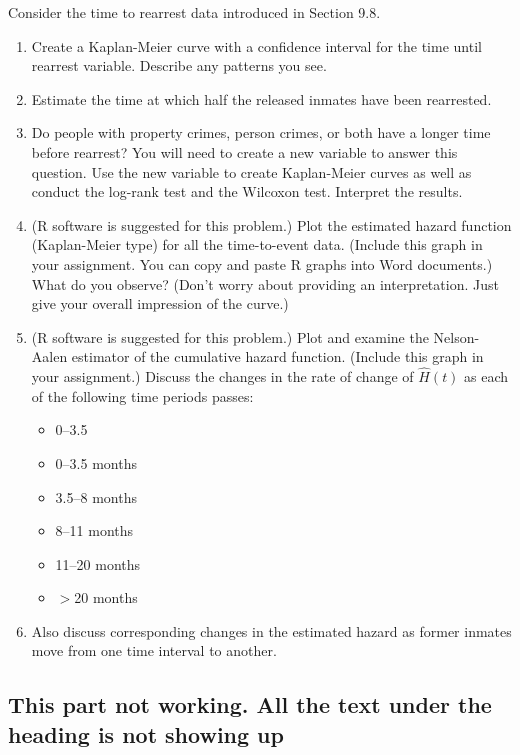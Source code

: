\documentclass[
]{report}
\begin{document}
\begin{list}{E.}{ \setlength{\itemsep}{1.2em}}
Consider the time to rearrest data introduced in Section 9.8.
  \begin{enumerate}
    \item Create a Kaplan-Meier curve with a confidence interval for the time until rearrest variable. Describe any patterns you see.
    \item Estimate the time at which half the released inmates have been rearrested.
    \item Do people with property crimes, person crimes, or both have a longer time before rearrest? You will need to create a new variable to answer this question. Use the new variable to create Kaplan-Meier curves as well as conduct the log-rank test and the Wilcoxon test. Interpret the results.
    \item (R software is suggested for this problem.) Plot the estimated hazard function (Kaplan-Meier type) for all the time-to-event data. (Include this graph in your assignment. You can copy and paste R graphs into Word documents.) What do you observe? (Don’t worry about providing an interpretation. Just give your overall impression of the curve.)
    \item (R software is suggested for this problem.) Plot and examine the Nelson-Aalen estimator of the cumulative hazard function. (Include this graph in your assignment.) Discuss the changes in the rate of change of $\widehat{H}(t)$ as each of the following time periods passes:
      \begin{itemize}
        \item 0–3.5
        \item 0–3.5 months
        \item 3.5–8 months
        \item 8–11 months
        \item 11–20 months
        \item $>$20 months
      \end{itemize}
    \item[] Also discuss corresponding changes in the estimated hazard as former inmates move from one time interval to another.
  \end{enumerate}

\end{list}

\subsection{This part not working. All the text under the heading is not showing up}\label{this-part-not-working.-all-the-text-under-the-heading-is-not-showing-up-1}
\end{document}

